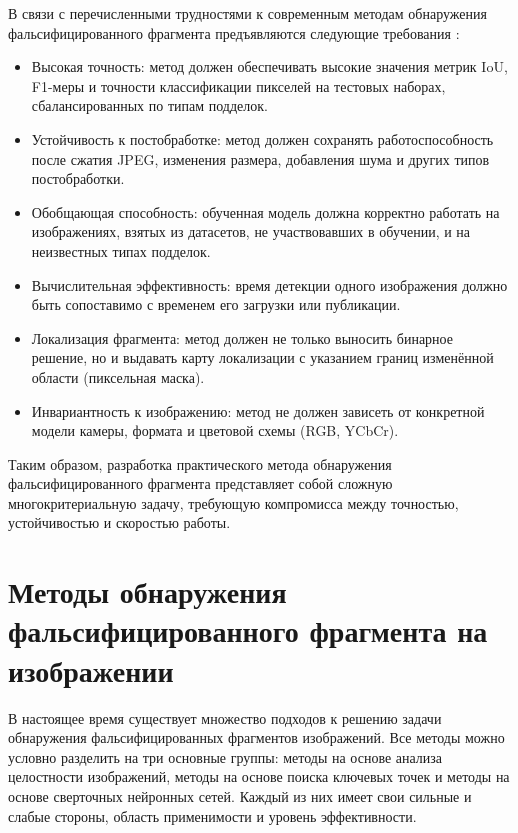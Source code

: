 В связи с перечисленными трудностями к современным методам обнаружения фальсифицированного фрагмента предъявляются следующие требования \cite{9}:

\begin{itemize}[label = ---]
	\item Высокая точность: метод должен обеспечивать высокие значения метрик IoU, F1-меры и точности классификации пикселей на тестовых наборах, сбалансированных по типам подделок.
	
	\item Устойчивость к постобработке: метод должен сохранять работоспособность после сжатия JPEG, изменения размера, добавления шума и других типов постобработки.
	
	\item Обобщающая способность: обученная модель должна корректно работать на изображениях, взятых из датасетов, не участвовавших в обучении, и на неизвестных типах подделок.
	
	\item Вычислительная эффективность: время детекции одного изображения должно быть сопоставимо с временем его загрузки или публикации.
	
	\item Локализация фрагмента: метод должен не только выносить бинарное решение, но и выдавать карту локализации с указанием границ изменённой области (пиксельная маска).
	
	\item Инвариантность к изображению: метод не должен зависеть от конкретной модели камеры, формата и цветовой схемы (RGB, YCbCr).
\end{itemize}

Таким образом, разработка практического метода обнаружения фальсифицированного фрагмента представляет собой сложную многокритериальную задачу, требующую компромисса между точностью, устойчивостью и скоростью работы.

\section{Методы обнаружения фальсифицированного фрагмента на изображении}

В настоящее время существует множество подходов к решению задачи обнаружения фальсифицированных фрагментов изображений. Все методы можно условно разделить на три основные группы: методы на основе анализа целостности изображений, методы на основе поиска ключевых точек и методы на основе сверточных нейронных сетей. Каждый из них имеет свои сильные и слабые стороны, область применимости и уровень эффективности.

